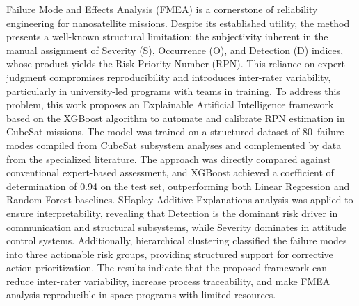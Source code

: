 Failure Mode and Effects Analysis (FMEA) is a cornerstone of reliability engineering for nanosatellite missions. Despite its established utility, the method presents a well-known structural limitation: the subjectivity inherent in the manual assignment of Severity (S), Occurrence (O), and Detection (D) indices, whose product yields the Risk Priority Number (RPN). This reliance on expert judgment compromises reproducibility and introduces inter-rater variability, particularly in university-led programs with teams in training. To address this problem, this work proposes an Explainable Artificial Intelligence framework based on the XGBoost algorithm to automate and calibrate RPN estimation in CubeSat missions. The model was trained on a structured dataset of 80~failure modes compiled from CubeSat subsystem analyses and complemented by data from the specialized literature. The approach was directly compared against conventional expert-based assessment, and XGBoost achieved a coefficient of determination of 0.94 on the test set, outperforming both Linear Regression and Random Forest baselines. SHapley Additive Explanations analysis was applied to ensure interpretability, revealing that Detection is the dominant risk driver in communication and structural subsystems, while Severity dominates in attitude control systems. Additionally, hierarchical clustering classified the failure modes into three actionable risk groups, providing structured support for corrective action prioritization. The results indicate that the proposed framework can reduce inter-rater variability, increase process traceability, and make FMEA analysis reproducible in space programs with limited resources.